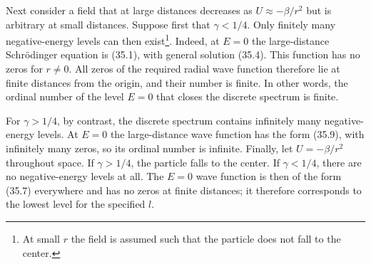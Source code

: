 Next consider a field that at large distances decreases as
$U\approx-\beta/r^2$ but is arbitrary at small distances. Suppose first that
$\gamma<1/4$. Only finitely many negative-energy levels can then
exist\footnote{At small $r$ the field is assumed such that the particle does
not fall to the center.}. Indeed, at $E=0$ the large-distance Schrödinger
equation is (35.1), with general solution (35.4). This function has no zeros
for $r\ne0$. All zeros of the required radial wave function therefore lie at
finite distances from the origin, and their number is finite. In other
words, the ordinal number of the level $E=0$ that closes the discrete
spectrum is finite.

For $\gamma>1/4$, by contrast, the discrete spectrum contains infinitely
many negative-energy levels. At $E=0$ the large-distance wave function has
the form (35.9), with infinitely many zeros, so its ordinal number is
infinite.
Finally, let $U=-\beta/r^2$ throughout space. If $\gamma>1/4$, the particle
falls to the center. If $\gamma<1/4$, there are no negative-energy levels at
all. The $E=0$ wave function is then of the form (35.7) everywhere and has no
zeros at finite distances; it therefore corresponds to the lowest level for
the specified $l$.
